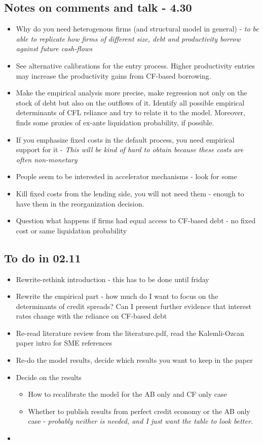 \documentclass[12pt]{article}
\begin{document}
\subsection*{Notes on comments and talk - 4.30}
\begin{itemize} \setlength\itemsep{0em} \small
    \item Why do you need heterogenous firms (and structural model in general) - \textit{to be able to replicate how firms of different size, debt and productivity borrow against future cash-flows}
    \item See alternative calibrations for the entry process. Higher productivity entries may increase the productivity gains from CF-based borrowing. 
    \item Make the empirical analysis more precise, make regression not only on the stock of debt but also on the outflows of it. Identify all possible empirical determinants of CFL reliance and try to relate it to the model. Moreover, finds some proxies of ex-ante liquidation probability, if possible. 
    \item If you emphasize fixed costs in the default process, you need empirical support for it - \textit{This will be kind of hard to obtain because these costs are often non-monetary}
    \item People seem to be interested in accelerator mechanisms - look for some 
    \item Kill fixed costs from the lending side, you will not need them - enough to have them in the reorganization decision. 
    \item Question what happens if firms had equal access to CF-based debt - no fixed cost or same liquidation probability
\end{itemize} \normalsize


\subsection*{To do in 02.11}
\begin{itemize} \setlength\itemsep{0em} \small
    \item Rewrite-rethink introduction - this has to be done until friday
    \item Rewrite the empirical part - how much do I want to focus on the determinants of credit spreads? Can I present further evidence that interest rates change with the reliance on CF-based debt
    \item Re-read literature review from the literature.pdf, read the Kalemli-Ozcan paper intro for SME references
    \item Re-do the model results, decide which results you want to keep in the paper
    \item Decide on the results
    \begin{itemize}
        \item How to recalibrate the model for the AB only and CF only case
        \item Whether to publish results from perfect credit economy or the AB only case - \textit{probably neither is needed, and I just want the table to look better.}
    \end{itemize}
    \item 
\end{itemize} \normalsize
\end{document}

